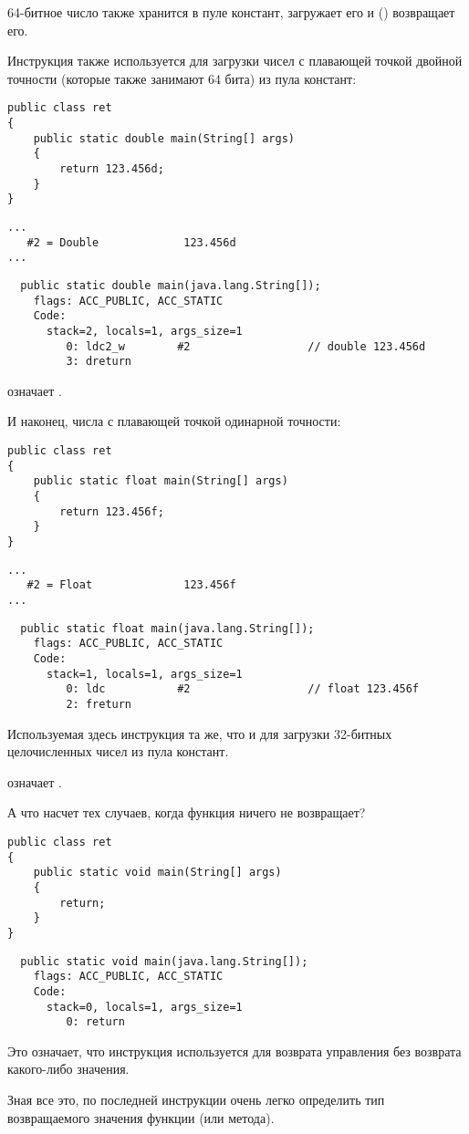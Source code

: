 64-битное число также хранится в пуле констант,  загружает его и  
() возвращает его.

Инструкция  также используется для загрузки чисел с плавающей точкой двойной 
точности (которые также занимают 64 бита) из пула констант:

\begin{lstlisting}
public class ret
{
	public static double main(String[] args)
	{
		return 123.456d;
	}
}
\end{lstlisting}

\begin{lstlisting}[caption=Constant pool]
...
   #2 = Double             123.456d
...
\end{lstlisting}

\begin{lstlisting}
  public static double main(java.lang.String[]);
    flags: ACC_PUBLIC, ACC_STATIC
    Code:
      stack=2, locals=1, args_size=1
         0: ldc2_w        #2                  // double 123.456d
         3: dreturn       
\end{lstlisting}

 означает .

И наконец, числа с плавающей точкой одинарной точности:

\begin{lstlisting}
public class ret
{
	public static float main(String[] args)
	{
		return 123.456f;
	}
}
\end{lstlisting}

\begin{lstlisting}[caption=Constant pool]
...
   #2 = Float              123.456f
...
\end{lstlisting}

\begin{lstlisting}
  public static float main(java.lang.String[]);
    flags: ACC_PUBLIC, ACC_STATIC
    Code:
      stack=1, locals=1, args_size=1
         0: ldc           #2                  // float 123.456f
         2: freturn       
\end{lstlisting}

Используемая здесь инструкция  та же, что и для загрузки 32-битных целочисленных чисел
из пула констант.

 означает .

А что насчет тех случаев, когда функция ничего не возвращает?

\begin{lstlisting}
public class ret
{
	public static void main(String[] args) 
	{
		return;
	}
}
\end{lstlisting}

\begin{lstlisting}
  public static void main(java.lang.String[]);
    flags: ACC_PUBLIC, ACC_STATIC
    Code:
      stack=0, locals=1, args_size=1
         0: return        
\end{lstlisting}

Это означает, что инструкция  используется для возврата управления 
без возврата какого-либо значения.

Зная все это, по последней инструкции очень легко определить тип возвращаемого 
значения функции (или метода).
